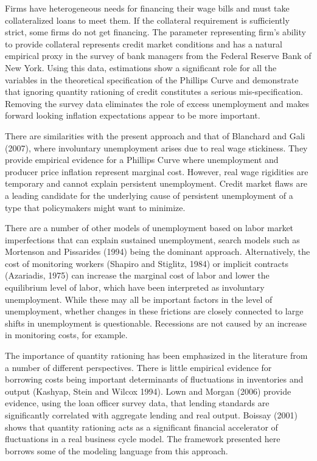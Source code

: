 \documentclass{article}
\begin{document}
Firms have heterogeneous needs for financing their wage bills and must take
collateralized loans to meet them. If the collateral requirement is
sufficiently strict, some firms do not get financing. The parameter
representing firm's ability to provide collateral represents credit market
conditions and has a natural empirical proxy in the survey of bank managers
from the Federal Reserve Bank of New York. Using this data, estimations
show a significant role for all the variables in the theoretical
specification of the Phillips Curve and demonstrate that ignoring quantity
rationing of credit constitutes a serious mis-specification. Removing the
survey data eliminates the role of excess unemployment and makes forward
looking inflation expectations appear to be more important.

There are similarities with the present approach and that of Blanchard and
Gali (2007), where involuntary unemployment arises due to real wage
stickiness. They provide empirical evidence for a Phillips Curve where
unemployment and producer price inflation represent marginal cost. However,
real wage rigidities are temporary and cannot explain persistent
unemployment. Credit market flaws are a leading candidate for the
underlying cause of persistent unemployment of a type that policymakers
might want to minimize.

There are a number of other models of unemployment based on labor market
imperfections that can explain sustained unemployment, search models such as
Mortenson and Pissarides (1994) being the dominant approach. Alternatively,
the cost of monitoring workers (Shapiro and Stiglitz, 1984) or implicit
contracts (Azariadis, 1975) can increase the marginal cost of labor and
lower the equilibrium level of labor, which have been interpreted as
involuntary unemployment. While these may all be important factors in the
level of unemployment, whether changes in these frictions are closely
connected to large shifts in unemployment is questionable. Recessions are
not caused by an increase in monitoring costs, for example.

The importance of quantity rationing has been emphasized in the literature
from a number of different perspectives. There is little empirical evidence
for borrowing costs being important determinants of fluctuations in
inventories and output (Kashyap, Stein and Wilcox 1994). Lown and Morgan
(2006) provide evidence, using the loan officer survey data, that lending
standards are significantly correlated with aggregate lending and real
output. Boissay (2001) shows that quantity rationing acts as a significant
financial accelerator of fluctuations in a real business cycle model. The
framework presented here borrows some of the modeling language from this
approach.
\end{document}
